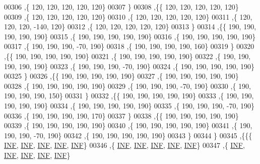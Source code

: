 \begin{DoxyCode}
00306   ,\{   120,   120,   120,   120,   120\}
00307   \}
00308  ,\{\{   120,   120,   120,   120,   120\}
00309   ,\{   120,   120,   120,   120,   120\}
00310   ,\{   120,   120,   120,   120,   120\}
00311   ,\{   120,   120,   120,  -140,   120\}
00312   ,\{   120,   120,   120,   120,   120\}
00313   \}
00314  ,\{\{   190,   190,   190,   190,   190\}
00315   ,\{   190,   190,   190,   190,   190\}
00316   ,\{   190,   190,   190,   190,   190\}
00317   ,\{   190,   190,   190,   -70,   190\}
00318   ,\{   190,   190,   190,   190,   160\}
00319   \}
00320  ,\{\{   190,   190,   190,   190,   190\}
00321   ,\{   190,   190,   190,   190,   190\}
00322   ,\{   190,   190,   190,   190,   190\}
00323   ,\{   190,   190,   190,   -70,   190\}
00324   ,\{   190,   190,   190,   190,   190\}
00325   \}
00326  ,\{\{   190,   190,   190,   190,   190\}
00327   ,\{   190,   190,   190,   190,   190\}
00328   ,\{   190,   190,   190,   190,   190\}
00329   ,\{   190,   190,   190,   -70,   190\}
00330   ,\{   190,   190,   190,   190,   150\}
00331   \}
00332  ,\{\{   190,   190,   190,   190,   190\}
00333   ,\{   190,   190,   190,   190,   190\}
00334   ,\{   190,   190,   190,   190,   190\}
00335   ,\{   190,   190,   190,   -70,   190\}
00336   ,\{   190,   190,   190,   190,   170\}
00337   \}
00338  ,\{\{   190,   190,   190,   190,   190\}
00339   ,\{   190,   190,   190,   190,   190\}
00340   ,\{   190,   190,   190,   190,   190\}
00341   ,\{   190,   190,   190,   -70,   190\}
00342   ,\{   190,   190,   190,   190,   190\}
00343   \}
00344  \}
00345 ,\{\{\{   \mbox{\hyperlink{1_88_84__epars_8h_a12c2040f25d8e3a7b9e1c2024c618cb6}{INF}},   \mbox{\hyperlink{1_88_84__epars_8h_a12c2040f25d8e3a7b9e1c2024c618cb6}{INF}},   \mbox{\hyperlink{1_88_84__epars_8h_a12c2040f25d8e3a7b9e1c2024c618cb6}{INF}},   \mbox{\hyperlink{1_88_84__epars_8h_a12c2040f25d8e3a7b9e1c2024c618cb6}{INF}},   \mbox{\hyperlink{1_88_84__epars_8h_a12c2040f25d8e3a7b9e1c2024c618cb6}{INF}}\}
00346   ,\{   \mbox{\hyperlink{1_88_84__epars_8h_a12c2040f25d8e3a7b9e1c2024c618cb6}{INF}},   \mbox{\hyperlink{1_88_84__epars_8h_a12c2040f25d8e3a7b9e1c2024c618cb6}{INF}},   \mbox{\hyperlink{1_88_84__epars_8h_a12c2040f25d8e3a7b9e1c2024c618cb6}{INF}},   \mbox{\hyperlink{1_88_84__epars_8h_a12c2040f25d8e3a7b9e1c2024c618cb6}{INF}},   \mbox{\hyperlink{1_88_84__epars_8h_a12c2040f25d8e3a7b9e1c2024c618cb6}{INF}}\}
00347   ,\{   \mbox{\hyperlink{1_88_84__epars_8h_a12c2040f25d8e3a7b9e1c2024c618cb6}{INF}},   \mbox{\hyperlink{1_88_84__epars_8h_a12c2040f25d8e3a7b9e1c2024c618cb6}{INF}},   \mbox{\hyperlink{1_88_84__epars_8h_a12c2040f25d8e3a7b9e1c2024c618cb6}{INF}},   \mbox{\hyperlink{1_88_84__epars_8h_a12c2040f25d8e3a7b9e1c2024c618cb6}{INF}},   \mbox{\hyperlink{1_88_84__epars_8h_a12c2040f25d8e3a7b9e1c2024c618cb6}{INF}}\}

\end{DoxyCode}
